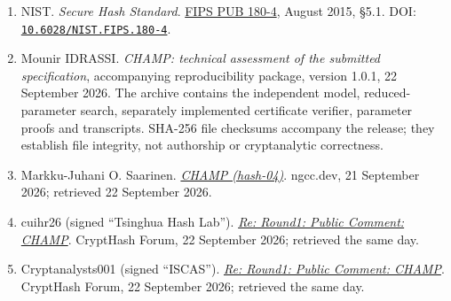 \documentclass[
  english,
  11pt,
  a4paper,
]{article}
\begin{document}
\begin{enumerate}
  NIST. \emph{A Statistical Test Suite for Random and Pseudorandom
  Number Generators for Cryptographic Applications}.
  \href{https://csrc.nist.gov/pubs/sp/800/22/r1/upd1/final}{SP 800-22
  Rev.~1a}, 2010. DOI:
  \href{https://doi.org/10.6028/NIST.SP.800-22r1a}{\nolinkurl{10.6028/NIST.SP.800-22r1a}}.
\item
  NIST. \emph{Secure Hash Standard}.
  \href{https://nvlpubs.nist.gov/nistpubs/FIPS/NIST.FIPS.180-4.pdf}{FIPS
  PUB 180-4}, August 2015, §5.1. DOI:
  \href{https://doi.org/10.6028/NIST.FIPS.180-4}{\nolinkurl{10.6028/NIST.FIPS.180-4}}.
\item
  Mounir IDRASSI. \emph{CHAMP: technical assessment of the submitted
  specification}, accompanying reproducibility package, version 1.0.1,
  22 September 2026. The archive contains the independent model,
  reduced-parameter search, separately implemented certificate verifier,
  parameter proofs and transcripts. SHA-256 file checksums accompany the
  release; they establish file integrity, not authorship or
  cryptanalytic correctness.
\item
  Markku-Juhani O. Saarinen.
  \emph{\href{https://ngcc.dev/reports/hash-04.html}{CHAMP (hash-04)}}.
  ngcc.dev, 21 September 2026; retrieved 22 September 2026.
\item
  cuihr26 (signed ``Tsinghua Hash Lab'').
  \emph{\href{https://list.niccs.org.cn/archives/list/crypthashforum@list.niccs.org.cn/message/QNMIAAKIPHG5FEK7QZEE2ZYBOWQHCZUE/}{Re:
  Round1: Public Comment: CHAMP}}. CryptHash Forum, 22 September 2026;
  retrieved the same day.
\item
  Cryptanalysts001 (signed ``ISCAS'').
  \emph{\href{https://list.niccs.org.cn/archives/list/crypthashforum@list.niccs.org.cn/message/6LSOFTTMTDWFWWRAZDREDYJNG5NXDVEC/}{Re:
  Round1: Public Comment: CHAMP}}. CryptHash Forum, 22 September 2026;
  retrieved the same day.
\end{enumerate}
\end{document}
